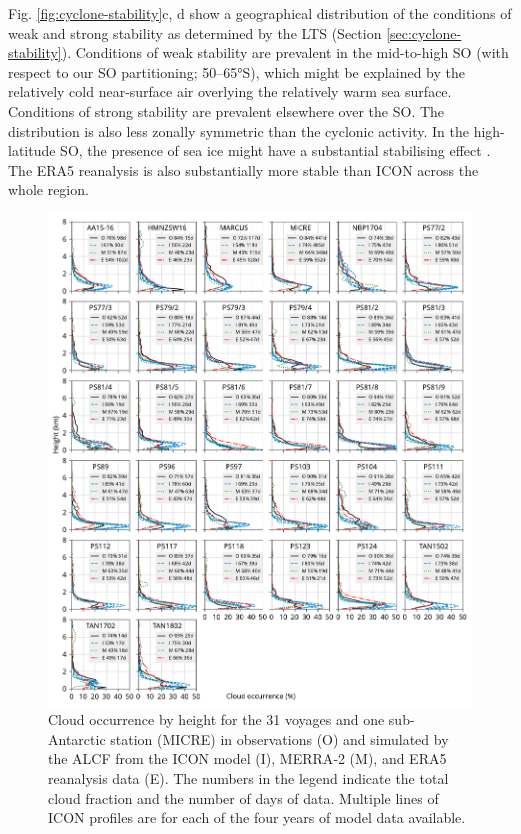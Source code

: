 \documentclass[draft]{agujournal2019}
\begin{document}
Fig. \ref{fig:cyclone-stability}c, d show a geographical distribution of the conditions of weak and strong stability as determined by the LTS (Section \ref{sec:cyclone-stability}). Conditions of weak stability are prevalent in the mid-to-high SO (with respect to our SO partitioning; 50--65°S), which might be explained by the relatively cold near-surface air overlying the relatively warm sea surface. Conditions of strong stability are prevalent elsewhere over the SO. The distribution is also less zonally symmetric than the cyclonic activity. In the high-latitude SO, the presence of sea ice might have a substantial stabilising effect \cite{knight2024}. The ERA5 reanalysis is also substantially more stable than ICON across the whole region.

\begin{figure}[p!]
\centerline{
\includegraphics[width=1.06\textwidth]{img/cloud_occurrence_panel.pdf}
}
\caption{
Cloud occurrence by height for the 31 voyages and one sub-Antarctic station (MICRE) in observations (O) and simulated by the ALCF from the ICON model (I), MERRA‐2 (M), and ERA5 reanalysis data (E). The numbers in the legend indicate the total cloud fraction and the number of days of data. Multiple lines of ICON profiles are for each of the four years of model data available.
}
\label{fig:cloud-occurrence-panel}
\end{figure}
\end{document}
